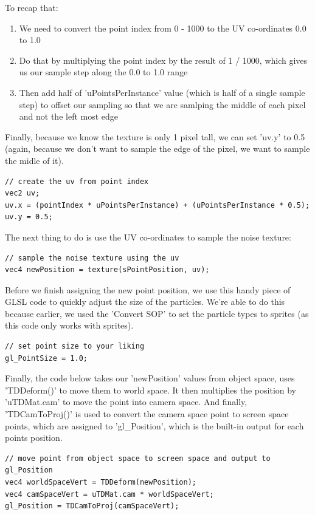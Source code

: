 \begin{fullwidth}
To recap that:
\begin{enumerate}
\item We need to convert the point index from 0 - 1000 to the UV co-ordinates 0.0 to 1.0
\item Do that by multiplying the point index by the result of 1 / 1000, which gives us our sample step along the 0.0 to 1.0 range
\item Then add half of 'uPointsPerInstance' value (which is half of a single sample step) to offset our sampling so that we are samlping the middle of each pixel and not the left most edge
\end{enumerate}

Finally, because we know the texture is only 1 pixel tall, we can set 'uv.y' to 0.5 (again, because we don't want to sample the edge of the pixel, we want to sample the midle of it).

\begin{lstlisting}
// create the uv from point index
vec2 uv;
uv.x = (pointIndex * uPointsPerInstance) + (uPointsPerInstance * 0.5);
uv.y = 0.5;
\end{lstlisting}

The next thing to do is use the UV co-ordinates to sample the noise texture:

\begin{lstlisting}
// sample the noise texture using the uv
vec4 newPosition = texture(sPointPosition, uv);
\end{lstlisting}

Before we finish assigning the new point position, we use this handy piece of GLSL code to quickly adjust the size of the particles. We're able to do this because earlier, we used the 'Convert SOP' to set the particle types to sprites (as this code only works with sprites).

\begin{lstlisting}
// set point size to your liking
gl_PointSize = 1.0;
\end{lstlisting}

Finally, the code below takes our 'newPosition' values from object space, uses 'TDDeform()' to move them to world space. It then multiplies the position by 'uTDMat.cam' to move the point into camera space. And finally, 'TDCamToProj()' is used to convert the camera space point to screen space points, which are assigned to 'gl\_Position', which is the built-in output for each points position.

\begin{lstlisting}
// move point from object space to screen space and output to gl_Position
vec4 worldSpaceVert = TDDeform(newPosition);
vec4 camSpaceVert = uTDMat.cam * worldSpaceVert;
gl_Position = TDCamToProj(camSpaceVert);
\end{lstlisting}


\end{fullwidth}

